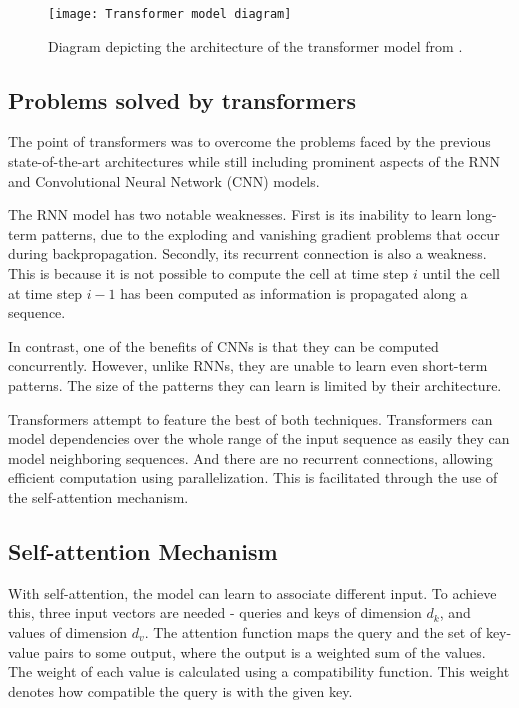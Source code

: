 \begin{figure}[h]
\centering
\texttt{[image: Transformer model diagram]}
\caption{Diagram depicting the architecture of the transformer model from \citet{AttentionIsAllYouNeed}.}
\label{fig:original transformer}
\end{figure}
\subsection{Problems solved by transformers}
The point of transformers was to overcome the problems faced by the previous state-of-the-art architectures while still including prominent aspects of the RNN and Convolutional Neural Network (CNN) models.

The RNN model has two notable weaknesses. First is its inability to learn long-term patterns, due to the exploding and vanishing gradient problems that occur during backpropagation.
Secondly, its recurrent connection is also a weakness. This is because it is not possible to compute the cell at time step $i$ until the cell at time step $i-1$ has been computed as information is propagated along a sequence.

In contrast, one of the benefits of CNNs is that they can be computed concurrently. However, unlike RNNs, they are unable to learn even short-term patterns. The size of the patterns they can learn is limited by their architecture.

Transformers attempt to feature the best of both techniques.
Transformers can model dependencies over the whole range of the input sequence as easily they can model neighboring sequences. And there are no recurrent connections, allowing efficient computation using parallelization. This is facilitated through the use of the self-attention mechanism.\cite{TransformersScratchPeterbloem}

 
\subsection{Self-attention Mechanism}


With self-attention, the model can learn to associate different input.
To achieve this, three input vectors are needed - queries and keys of dimension $d_k$, and values of dimension $d_v$.
The attention function maps the query and the set of key-value pairs to some output, where the output is a weighted sum of the values.
The weight of each value is calculated using a compatibility function.
This weight denotes how compatible the query is with the given key.



